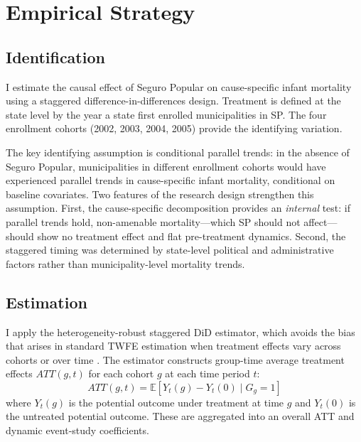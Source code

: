\documentclass[12pt]{article}
\newcommand{\E}{\mathbb{E}}
\begin{document}


\section{Empirical Strategy}

\subsection{Identification}

I estimate the causal effect of Seguro Popular on cause-specific infant mortality using a staggered difference-in-differences design. Treatment is defined at the state level by the year a state first enrolled municipalities in SP. The four enrollment cohorts (2002, 2003, 2004, 2005) provide the identifying variation.

The key identifying assumption is conditional parallel trends: in the absence of Seguro Popular, municipalities in different enrollment cohorts would have experienced parallel trends in cause-specific infant mortality, conditional on baseline covariates. Two features of the research design strengthen this assumption. First, the cause-specific decomposition provides an \textit{internal} test: if parallel trends hold, non-amenable mortality---which SP should not affect---should show no treatment effect and flat pre-treatment dynamics. Second, the staggered timing was determined by state-level political and administrative factors rather than municipality-level mortality trends.

\subsection{Estimation}

I apply the \citet{callaway2021} heterogeneity-robust staggered DiD estimator, which avoids the bias that arises in standard TWFE estimation when treatment effects vary across cohorts or over time \citep{goodmanbacon2021, dechaisemartin2020, sun2021}. The estimator constructs group-time average treatment effects $ATT(g,t)$ for each cohort $g$ at each time period $t$:
\begin{equation}
  ATT(g,t) = \E\left[Y_t(g) - Y_t(0) \mid G_g = 1\right]
\end{equation}
where $Y_t(g)$ is the potential outcome under treatment at time $g$ and $Y_t(0)$ is the untreated potential outcome. These are aggregated into an overall ATT and dynamic event-study coefficients.
\end{document}
